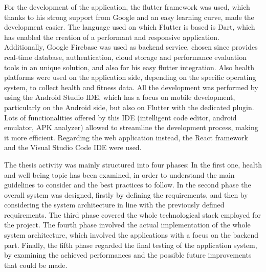 \noindent For the development of the application, the flutter framework was used, which thanks to his strong support from Google and an easy learning curve, made the development easier. The language used on which Flutter is based is Dart, which has enabled the creation of a performant and responsive application. Additionally, Google Firebase was used as backend service, chosen since provides real-time database, authentication, cloud storage and performance evaluation tools in an unique solution, and also for his easy flutter integration. Also health platforms were used on the application side, depending on the specific operating system, to collect health and fitness data. All the development was performed by using the Android Studio IDE, which has a focus on mobile development, particularly on the Android side, but also on Flutter with the dedicated plugin. Lots of functionalities offered by this IDE (intelligent code editor, android emulator, APK analyzer) allowed to streamline the development process, making it more efficient. Regarding the web application instead, the React framework and the Visual Studio Code IDE were used.
\vspace{0.5ex}

\noindent The thesis activity was mainly structured into four phases: In the first one, health and well being topic has been examined, in order to understand the main guidelines to consider and the best practices to follow. In the second phase the overall system was designed, firstly by defining the requirements, and then by considering the system architecture in line with the previously defined requirements. The third phase covered the whole technological stack employed for the project. The fourth phase involved the actual implementation of the whole system architecture, which involved the applications with a focus on the backend part. Finally, the fifth phase regarded the final testing of the application system, by examining the achieved performances and the possible future improvements that could be made.